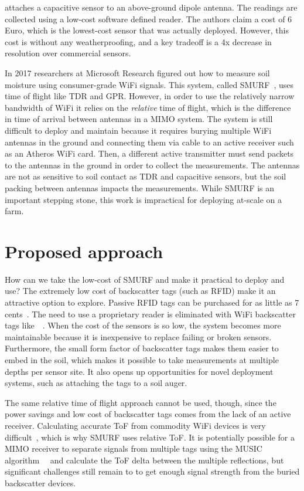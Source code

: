 \documentclass[12pt]{article}
\begin{document}
\cite{Daskalakis2016} attaches a capacitive sensor to an above-ground dipole
antenna. The readings are collected using a low-cost software defined
reader. The authors claim a cost of 6 Euro, which is the lowest-cost
sensor that was actually deployed. However, this cost is without any
weatherproofing, and a key tradeoff is a 4x decrease in resolution
over commercial sensors.


In 2017 researchers at Microsoft Research figured out how to measure
soil moisture using consumer-grade WiFi signals. This system, called
SMURF~\cite{smurf}, uses time of flight like TDR and GPR. However, in
order to use the relatively narrow bandwidth of WiFi it relies on the
\emph{relative} time of flight, which is the difference in time of
arrival between antennas in a MIMO system. The system is still
difficult to deploy and maintain because it requires burying multiple
WiFi antennas in the ground and connecting them via cable to an active
receiver such as an Atheros WiFi card. Then, a different active
transmitter must send packets to the antennas in the ground in order
to collect the measurements. The antennas are not as sensitive to soil
contact as TDR and capacitive sensors, but the soil packing between
antennas impacts the measurements. While SMURF is an important
stepping stone, this work is impractical for deploying at-scale on a
farm.

\section*{Proposed approach}
How can we take the low-cost of SMURF and make it practical to deploy
and use? The extremely low cost of backscatter tags (such as RFID) make
it an attractive option to explore. Passive RFID tags can be purchased
for as little as 7 cents~\cite{rfidcost}. The need to use a
proprietary reader is eliminated with WiFi backscatter tags
like~\cite{Zhang2017}~\cite{Zhang2016}. When the cost of the sensors
is so low, the system becomes more maintainable because it is
inexpensive to replace failing or broken sensors. Furthermore, the
small form factor of backscatter tags makes them easier to embed in
the soil, which makes it possible to take measurements at multiple
depths per sensor site. It also opens up opportunities for novel
deployment systems, such as attaching the tags to a soil auger.

The same relative time of flight approach cannot be used, though,
since the power savings and low cost of backscatter tags comes from
the lack of an active receiver. Calculating accurate ToF from
commodity WiFi devices is very difficult~\cite{Vasisht2015}, which is
why SMURF uses relative ToF. It is potentially possible for a MIMO
receiver to separate signals from multiple tags using the MUSIC
algorithm~\cite{Soltanaghaei2018}~\cite{Kotaru2015} and calculate the
ToF delta between the multiple reflections, but significant challenges
still remain to to get enough signal strength from the buried
backscatter devices.
\end{document}

